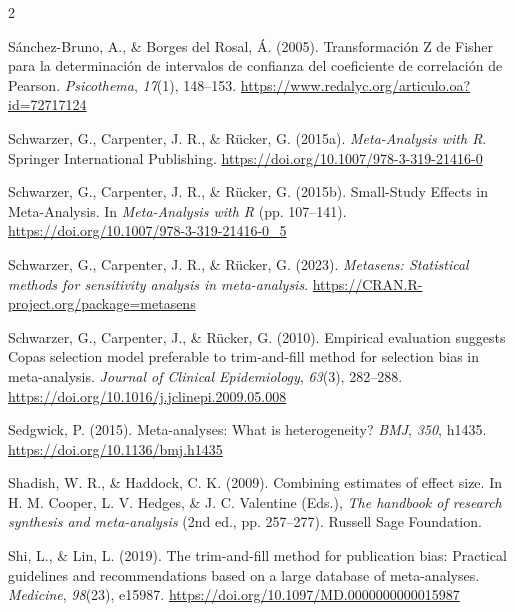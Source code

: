 \documentclass[
  bookmarksnumbered]{article}
\newlength{\cslhangindent}
\newlength{\cslentryspacingunit} %
\newenvironment{CSLReferences}[2] %
 {%
  \setlength{\parindent}{0pt}
  \ifodd #1
  \let\oldpar\par
  \def\par{\hangindent=\cslhangindent\oldpar}
  \fi
  \setlength{\parskip}{#2\cslentryspacingunit}
 }%
 {}
\begin{document}
\begin{multicols}{2}
\begin{CSLReferences}{1}{0}
\leavevmode{}%
Sánchez-Bruno, A., \& Borges del Rosal, Á. (2005). {Transformación Z de Fisher para la determinación de intervalos de confianza del coeficiente de correlación de Pearson}. \emph{Psicothema}, \emph{17}(1), 148--153. \url{https://www.redalyc.org/articulo.oa?id=72717124}

\leavevmode{}%
Schwarzer, G., Carpenter, J. R., \& Rücker, G. (2015a). \emph{Meta-{Analysis} with {R}}. {Springer International Publishing}. \url{https://doi.org/10.1007/978-3-319-21416-0}

\leavevmode{}%
Schwarzer, G., Carpenter, J. R., \& Rücker, G. (2015b). Small-{Study Effects} in {Meta}-{Analysis}. In \emph{Meta-{Analysis} with {R}} (pp. 107--141). \url{https://doi.org/10.1007/978-3-319-21416-0_5}

\leavevmode{}%
Schwarzer, G., Carpenter, J. R., \& Rücker, G. (2023). \emph{Metasens: Statistical methods for sensitivity analysis in meta-analysis}. \url{https://CRAN.R-project.org/package=metasens}

\leavevmode{}%
Schwarzer, G., Carpenter, J., \& Rücker, G. (2010). Empirical evaluation suggests {Copas} selection model preferable to trim-and-fill method for selection bias in meta-analysis. \emph{Journal of Clinical Epidemiology}, \emph{63}(3), 282--288. \url{https://doi.org/10.1016/j.jclinepi.2009.05.008}

\leavevmode{}%
Sedgwick, P. (2015). Meta-analyses: What is heterogeneity? \emph{BMJ}, \emph{350}, h1435. \url{https://doi.org/10.1136/bmj.h1435}

\leavevmode{}%
Shadish, W. R., \& Haddock, C. K. (2009). Combining estimates of effect size. In H. M. Cooper, L. V. Hedges, \& J. C. Valentine (Eds.), \emph{The handbook of research synthesis and meta-analysis} (2nd ed., pp. 257--277). {Russell Sage Foundation}.

\leavevmode{}%
Shi, L., \& Lin, L. (2019). The trim-and-fill method for publication bias: Practical guidelines and recommendations based on a large database of meta-analyses. \emph{Medicine}, \emph{98}(23), e15987. \url{https://doi.org/10.1097/MD.0000000000015987}


\end{CSLReferences}
\end{multicols}
\end{document}
